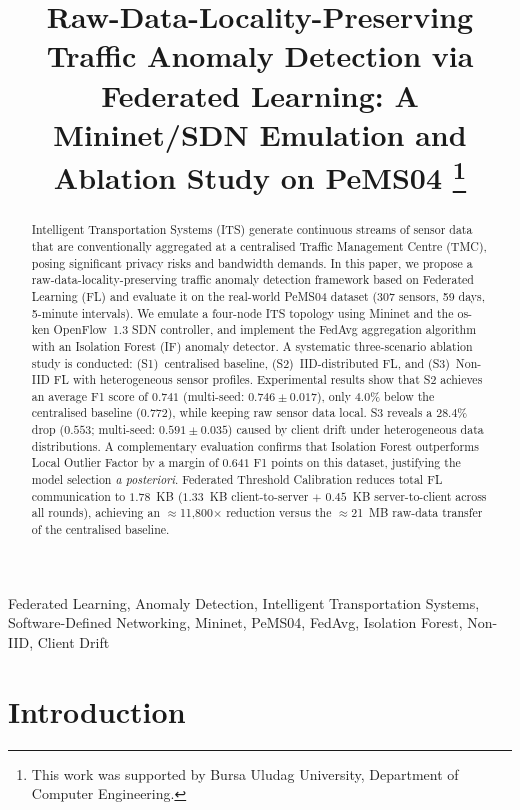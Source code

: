 \documentclass[conference]{IEEEtran}
\title{Raw-Data-Locality-Preserving Traffic Anomaly
Detection via Federated Learning: A Mininet/SDN
Emulation and Ablation Study on PeMS04%
\thanks{This work was supported by Bursa Uludag University,
Department of Computer Engineering.}
}
\author{\IEEEauthorblockN{Authors Anonymized}}
\begin{document}
\maketitle

\begin{abstract}
Intelligent Transportation Systems (ITS) generate continuous streams of
sensor data that are conventionally aggregated at a centralised Traffic
Management Centre (TMC), posing significant privacy risks and bandwidth
demands.
In this paper, we propose a raw-data-locality-preserving traffic anomaly
detection framework based on Federated Learning (FL) and evaluate it on the
real-world PeMS04 dataset (307 sensors, 59 days, 5-minute intervals).
We emulate a four-node ITS topology using Mininet and the os-ken
OpenFlow~1.3 SDN controller, and implement the FedAvg aggregation
algorithm with an Isolation Forest (IF) anomaly detector.
A systematic three-scenario ablation study is conducted: (S1)~centralised
baseline, (S2)~IID-distributed FL, and (S3)~Non-IID FL with
heterogeneous sensor profiles.
Experimental results show that S2 achieves an average F1 score of
$0.741$ (multi-seed: $0.746 \pm 0.017$), only $4.0\%$ below the
centralised baseline ($0.772$), while keeping raw sensor data local.
S3 reveals a $28.4\%$ drop ($0.553$; multi-seed: $0.591 \pm 0.035$)
caused by client drift under heterogeneous data distributions.
A complementary evaluation confirms that Isolation Forest outperforms
Local Outlier Factor by a margin of $0.641$ F1 points on this dataset,
justifying the model selection \textit{a posteriori}.
Federated Threshold Calibration reduces total FL communication to
$1.78$~KB ($1.33$~KB client-to-server $+$ $0.45$~KB server-to-client
across all rounds), achieving an $\approx$11,800$\times$ reduction versus
the $\approx$21~MB raw-data transfer of the centralised baseline.
\end{abstract}

\begin{IEEEkeywords}
Federated Learning, Anomaly Detection, Intelligent Transportation
Systems, Software-Defined Networking, Mininet, PeMS04, FedAvg,
Isolation Forest, Non-IID, Client Drift
\end{IEEEkeywords}

\section{Introduction}
\end{document}
